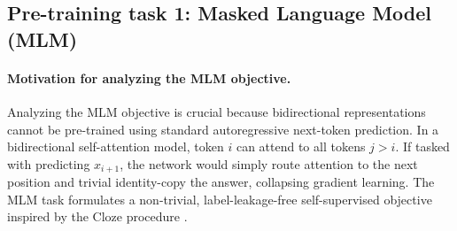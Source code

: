 \documentclass[../../main.tex]{subfiles}
\begin{document}
\subsection{Pre-training task 1: Masked Language Model (MLM)}
\label{subsec:bert_masked_lm}

\paragraph{Motivation for analyzing the MLM objective.}
Analyzing the MLM objective is crucial because bidirectional representations cannot be pre-trained using standard autoregressive next-token prediction. In a bidirectional self-attention model, token $i$ can attend to all tokens $j > i$. If tasked with predicting $x_{i+1}$, the network would simply route attention to the next position and trivial identity-copy the answer, collapsing gradient learning. The MLM task formulates a non-trivial, label-leakage-free self-supervised objective inspired by the Cloze procedure \cite{devlin2019}.
\end{document}
